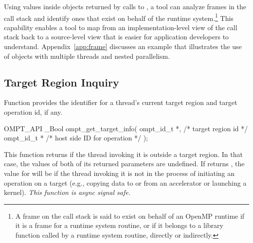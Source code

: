 \documentclass{article}
\begin{document}

Using values inside   objects returned by calls to  , a tool can analyze  frames in the call stack and identify ones that exist on behalf of the runtime system.\footnote{A frame on the call stack is said to exist on behalf of an OpenMP runtime if it is a frame for a runtime system routine, or if it belongs to a library function called by a runtime system routine, directly or indirectly.} 
This capability enables a tool to map from an implementation-level view of the call stack back to a source-level view that is easier for application developers to understand. 
Appendix~\ref{app:frame} discusses  an example that illustrates the use of  objects with multiple threads and nested parallelism.

\subsection{Target Region Inquiry}
\label{sec:target-region}

Function  provides the identifier for a thread's current target region and target operation id, if any.
\begin{boxedcode}
OMPT\_API \_Bool ompt\_get\_target\_info(
  ompt\_id\_t *,                             /* target region id           */
  ompt\_id\_t *                             /* host side ID for operation */
);
\end{boxedcode}
This function returns  if the thread invoking it is
outside a target region. In that case, the values of both of its
returned parameters are undefined. If 
returns , the value for  will be
 if the thread invoking it is not in the process of initiating an operation on a target (e.g., copying data to or from an accelerator or launching a kernel).  {\em This function is async signal safe.}
\end{document}
